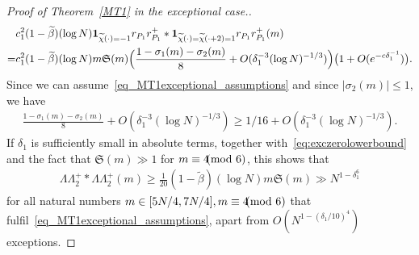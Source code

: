 \documentclass[12pt]{amsart}
\theoremstyle{definition}
\theoremstyle{remark}
\numberwithin{equation}{section}
\newcommand{\1}{\mathbf{1}}
\let\oldpmod\pmod
\renewcommand{\pmod}[1]{\hspace{-0.12cm}\oldpmod {#1}}
\begin{document}
\begin{proof}[Proof of Theorem~\ref{MT1} in the exceptional case.]
\begin{align*}
					&c_1^2 (1-\widetilde{\beta})(\log N) \1_{\widetilde{\chi}(\cdot)=-1}r_{P_1} r^+_{P_1}* \1_{\widetilde{\chi}(\cdot)=\widetilde{\chi}(\cdot+2)=1}r_{P_1} r^+_{P_1}(m)\\
					=&c_1^2 (1-\widetilde{\beta})(\log N)m\mathfrak{S}(m)\Bigl( \frac{1-\sigma_1(m)-\sigma_2(m)}{8}+O(\delta_1^{-3}(\log N)^{-1/3})\Bigr)\bigl(1+ O(e^{-c \delta_1^{-1}})\bigr).
				\end{align*}
				Since we can assume~\eqref{eq_MT1exceptional_assumptions} and since  $|\sigma_2(m)|\leq 1$, we have
				\begin{align*}
					\frac{1-\sigma_1(m)-\sigma_2(m)}{8}+O(\delta_1^{-3}(\log N)^{-1/3})\geq 1/16+O(\delta_1^{-3}(\log N)^{-1/3}).
				\end{align*}
				If $\delta_1$ is sufficiently small in absolute terms, together with~\eqref{eq:exczerolowerbound} and the fact that $\mathfrak{S}(m)\gg 1$ for $m\equiv 4 \pmod 6$, this shows that
				\begin{align*}
					\Lambda \Lambda_2^+*\Lambda \Lambda_2^+(m)\geq \frac{1}{20} (1-\widetilde{\beta})(\log N)m \mathfrak{S}(m)\gg N^{1-\delta_1^6}
				\end{align*}
				for all natural numbers $m\in [5N/4,7N/4], m\equiv 4\pmod 6$ that fulfil~\eqref{eq_MT1exceptional_assumptions}, apart from $O(N^{1-(\delta_1/10)^4})$ exceptions.  
                \end{proof}










{}
			


		
\end{document}
